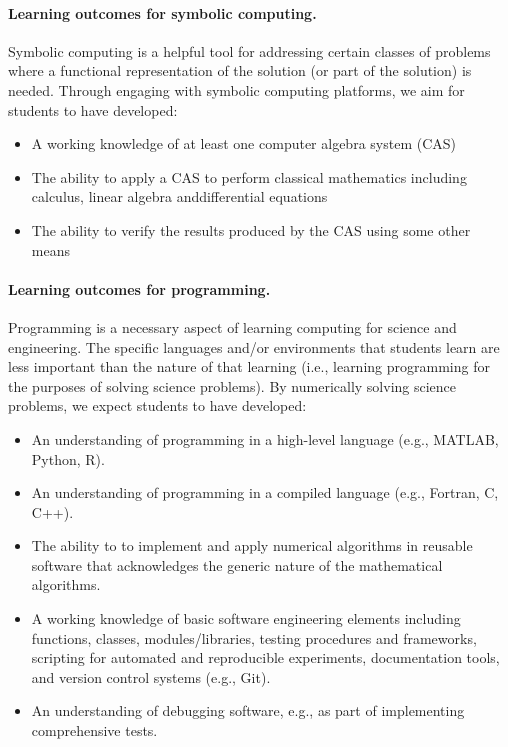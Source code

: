 \noindent
\paragraph{Learning outcomes for symbolic computing.}
Symbolic computing is a helpful tool for addressing certain classes of problems where a functional representation of the solution (or part of the solution) is needed. Through engaging with symbolic computing platforms, we aim for students to have developed:

\begin{itemize}
\item A working knowledge of at least one computer algebra system (CAS)

\item The ability to apply a CAS to perform classical mathematics including calculus, linear algebra anddifferential equations

\item The ability to verify the results produced by the CAS using some other means
\end{itemize}

\noindent
\paragraph{Learning outcomes for programming.}
Programming is a necessary aspect of learning computing for science and engineering. The specific languages and/or environments that students learn are less important than the nature of that learning (i.e., learning programming for the purposes of solving science problems). By numerically solving science problems, we expect students to have developed:

\begin{itemize}
\item An understanding of programming in a high-level language (e.g., MATLAB, Python, R).

\item An understanding of programming in a compiled language (e.g., Fortran, C, C++).

\item The ability to to implement and apply numerical algorithms in reusable software that acknowledges the generic nature of the mathematical algorithms.

\item A working knowledge of basic software engineering elements including functions, classes, modules/libraries, testing procedures and frameworks, scripting for automated and reproducible experiments, documentation tools, and version control systems (e.g., Git).

\item An understanding of debugging software, e.g., as part of implementing comprehensive tests.
\end{itemize}

